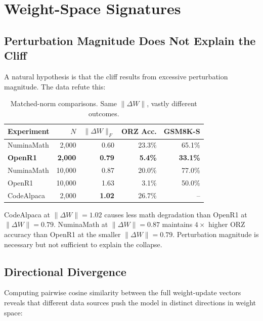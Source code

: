 \documentclass{article}
\begin{document}
\section{Weight-Space Signatures}
\label{sec:weights}

\subsection{Perturbation Magnitude Does Not Explain the Cliff}

A natural hypothesis is that the cliff results from excessive perturbation magnitude. The data refute this:

\begin{table}[h]
\centering
\caption{Matched-norm comparisons. Same $\|\Delta W\|$, vastly different outcomes.}
\label{tab:norm-paradox}
\small
\begin{tabular}{@{}lrrrr@{}}
\toprule
Experiment & $N$ & $\|\Delta W\|_F$ & ORZ Acc. & GSM8K-S \\
\midrule
NuminaMath & 2,000 & 0.60 & 23.3\% & 65.1\% \\
\textbf{OpenR1} & \textbf{2,000} & \textbf{0.79} & \textbf{5.4\%} & \textbf{33.1\%} \\
\midrule
NuminaMath & 10,000 & 0.87 & 20.0\% & 77.0\% \\
OpenR1 & 10,000 & 1.63 & 3.1\% & 50.0\% \\
\midrule
CodeAlpaca & 2,000 & \textbf{1.02} & 26.7\% & -- \\
\bottomrule
\end{tabular}
\end{table}

CodeAlpaca at $\|\Delta W\| = 1.02$ causes less math degradation than OpenR1 at $\|\Delta W\| = 0.79$. NuminaMath at $\|\Delta W\| = 0.87$ maintains $4{\times}$ higher ORZ accuracy than OpenR1 at the smaller $\|\Delta W\| = 0.79$. Perturbation magnitude is necessary but not sufficient to explain the collapse.

\subsection{Directional Divergence}

Computing pairwise cosine similarity between the full weight-update vectors reveals that different data sources push the model in distinct directions in weight space:
\end{document}
